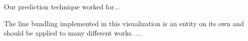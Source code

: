 \documentclass[journal]{vgtc}                %
\begin{document}
Our prediction technique worked for...

The line bundling implemented in this visualization is an entity on its own and should be applied to many different works. ...





\newpage



\nocite{*}

\end{document}
